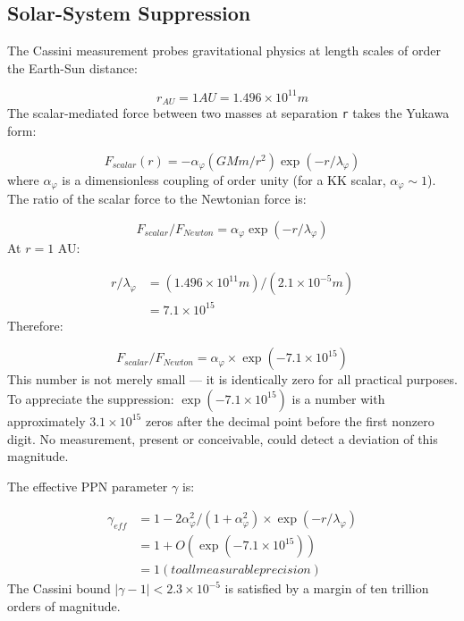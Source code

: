 \documentclass[aps,prd,preprint,superscriptaddress,longbibliography,floatfix]{revtex4-2}
\theoremstyle{remark}
\begin{document}
\subsection{Solar-System Suppression}

The Cassini measurement probes gravitational physics at length scales of order the Earth-Sun distance:


\begin{equation}
    r_{AU} = 1 AU = 1.496 \times 10^{11} m
\end{equation}
The scalar-mediated force between two masses at separation \texttt{r} takes the Yukawa form:


\begin{equation}
    F_{scalar}(r) = -\alpha_\varphi (G M m / r^{2}) \exp(-r / \lambda_\varphi)
\end{equation}
where $\alpha_\varphi$ is a dimensionless coupling of order unity (for a KK scalar, $\alpha_\varphi \sim  1$). The ratio of the scalar force to the Newtonian force is:


\begin{equation}
    F_{scalar} / F_{Newton} = \alpha_\varphi \exp(-r / \lambda_\varphi)
\end{equation}
At $r = 1$ AU:


\begin{align}
    r / \lambda_\varphi &= (1.496 \times 10^{11} m) / (2.1 \times 10^{-5} m) \\
    & = 7.1 \times 10^{15}
\end{align}
Therefore:


\begin{equation}
    F_{scalar} / F_{Newton} = \alpha_\varphi \times \exp(-7.1 \times 10^{15})
\end{equation}
This number is not merely small --- it is identically zero for all practical purposes. To appreciate the suppression: $\exp(-7.1 \times 10^{15})$ is a number with approximately $3.1 \times 10^{15}$ zeros after the decimal point before the first nonzero digit. No measurement, present or conceivable, could detect a deviation of this magnitude.

The effective PPN parameter $\gamma$ is:


\begin{align}
    \gamma_{eff} &= 1 - 2 \alpha_\varphi^{2} / (1 + \alpha_\varphi^{2}) \times \exp(-r / \lambda_\varphi) \\
    & = 1 + O(\exp(-7.1 \times 10^{15})) \\
    & = 1    (to all measurable precision)
\end{align}
The Cassini bound $|\gamma - 1| < 2.3 \times 10^{-5}$ is satisfied by a margin of ten trillion orders of magnitude.
\end{document}
